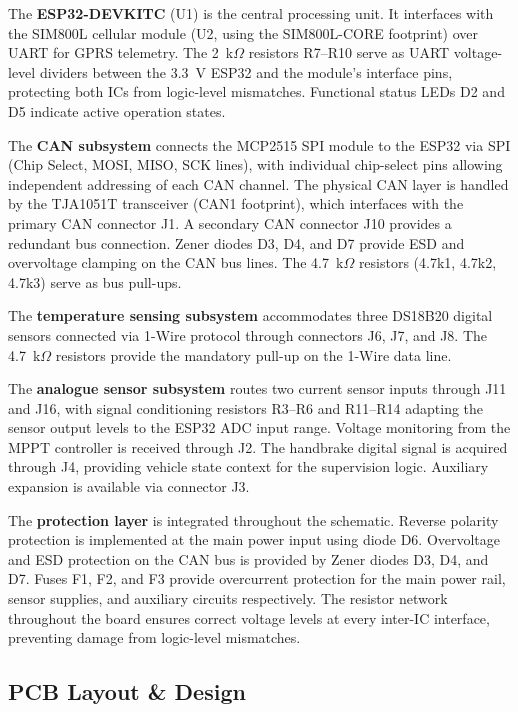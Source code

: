 The \textbf{ESP32-DEVKITC} (U1) is the central processing unit. It interfaces with the SIM800L cellular module (U2, using the SIM800L-CORE footprint) over UART for GPRS telemetry. The 2~k$\Omega$ resistors R7--R10 serve as UART voltage-level dividers between the 3.3~V ESP32 and the module's interface pins, protecting both ICs from logic-level mismatches. Functional status LEDs D2 and D5 indicate active operation states.

The \textbf{CAN subsystem} connects the MCP2515 SPI module to the ESP32 via SPI (Chip Select, MOSI, MISO, SCK lines), with individual chip-select pins allowing independent addressing of each CAN channel. The physical CAN layer is handled by the TJA1051T transceiver (CAN1 footprint), which interfaces with the primary CAN connector J1. A secondary CAN connector J10 provides a redundant bus connection. Zener diodes D3, D4, and D7 provide ESD and overvoltage clamping on the CAN bus lines. The 4.7~k$\Omega$ resistors (4.7k1, 4.7k2, 4.7k3) serve as bus pull-ups.

The \textbf{temperature sensing subsystem} accommodates three DS18B20 digital sensors connected via 1-Wire protocol through connectors J6, J7, and J8. The 4.7~k$\Omega$ resistors provide the mandatory pull-up on the 1-Wire data line.

The \textbf{analogue sensor subsystem} routes two current sensor inputs through J11 and J16, with signal conditioning resistors R3--R6 and R11--R14 adapting the sensor output levels to the ESP32 ADC input range. Voltage monitoring from the MPPT controller is received through J2. The handbrake digital signal is acquired through J4, providing vehicle state context for the supervision logic. Auxiliary expansion is available via connector J3.

The \textbf{protection layer} is integrated throughout the schematic. Reverse polarity protection is implemented at the main power input using diode D6. Overvoltage and ESD protection on the CAN bus is provided by Zener diodes D3, D4, and D7. Fuses F1, F2, and F3 provide overcurrent protection for the main power rail, sensor supplies, and auxiliary circuits respectively. The resistor network throughout the board ensures correct voltage levels at every inter-IC interface, preventing damage from logic-level mismatches.

\subsection{PCB Layout \& Design}

